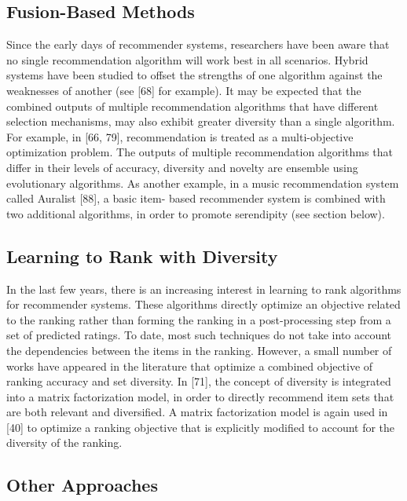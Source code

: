 \subsection{Fusion-Based Methods}

Since the early days of recommender systems, researchers have been aware that no single recommendation algorithm will work best in all scenarios. Hybrid systems have been studied to offset the strengths of one algorithm against the weaknesses of another (see [68] for example). It may be expected that the combined outputs of multiple recommendation algorithms that have different selection mechanisms, may also exhibit greater diversity than a single algorithm. For example, in [66, 79], recommendation is treated as a multi-objective optimization problem. The outputs of multiple recommendation algorithms that differ in their levels of accuracy, diversity and novelty are ensemble using evolutionary algorithms. As another example, in a music recommendation system called Auralist [88], a basic item- based recommender system is combined with two additional algorithms, in order to promote serendipity (see section below).

\subsection{Learning to Rank with Diversity}

In the last few years, there is an increasing interest in learning to rank algorithms for recommender systems. These algorithms directly optimize an objective related to the ranking rather than forming the ranking in a post-processing step from a set of predicted ratings. To date, most such techniques do not take into account the dependencies between the items in the ranking. However, a small number of works have appeared in the literature that optimize a combined objective of ranking accuracy and set diversity. In [71], the concept of diversity is integrated into a matrix factorization model, in order to directly recommend item sets that are both relevant and diversified. A matrix factorization model is again used in [40] to optimize a ranking objective that is explicitly modified to account for the diversity of the ranking.

\subsection{Other Approaches}

